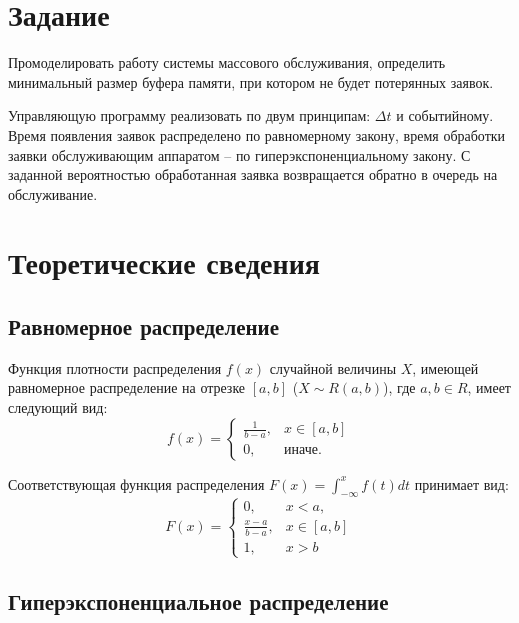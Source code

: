 \documentclass[14pt, a4paper]{extarticle}
\begin{document}


\setcounter{page}{2}

\section{Задание}

Промоделировать работу системы массового обслуживания, определить минимальный размер буфера памяти, при котором не будет потерянных заявок. 

Управляющую программу реализовать по двум принципам: $\Delta t$ и событийному. Время появления заявок распределено по равномерному закону, время обработки заявки обслуживающим аппаратом -- по гиперэкспоненциальному закону. С заданной вероятностью обработанная заявка возвращается обратно в очередь на обслуживание.

\section{Теоретические сведения}

\subsection{Равномерное распределение}

Функция плотности распределения $f(x)$ случайной величины $X$, имеющей равномерное распределение на отрезке $[a, b]$ ($X \sim R(a, b)$), где $a, b \in R$, имеет следующий вид:
\begin{equation}
	f(x)=\begin{cases}
		\frac{1}{b - a}, & x \in [a, b] \\
		0, & \text{иначе}.
	\end{cases}
\end{equation}

Соответствующая функция распределения $F(x) = \int_{-\infty}^{x}f(t)dt$ принимает вид: 
\begin{equation}
	F(x)=\begin{cases}
		0, & x < a, \\
		\frac{x - a}{b - a}, & x \in [a, b] \\
		1, & x > b
	\end{cases}
\end{equation}


\subsection{Гиперэкспоненциальное распределение}
\end{document}

